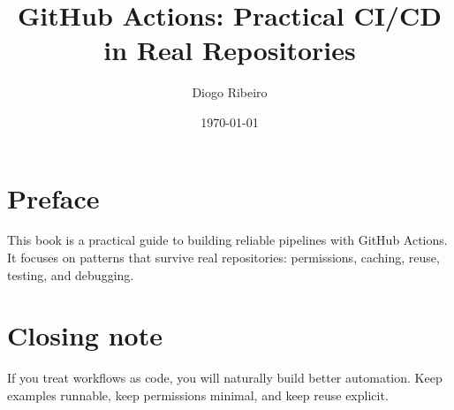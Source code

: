 \documentclass[11pt,a4paper,oneside]{book}
\title{GitHub Actions: Practical CI/CD in Real Repositories}
\author{Diogo Ribeiro}
\date{\today}
\begin{document}
\frontmatter
\maketitle
\tableofcontents

\chapter*{Preface}
This book is a practical guide to building reliable pipelines with GitHub Actions.
It focuses on patterns that survive real repositories: permissions, caching, reuse, testing, and debugging.

\mainmatter


















\appendix



\backmatter
\chapter*{Closing note}
If you treat workflows as code, you will naturally build better automation.
Keep examples runnable, keep permissions minimal, and keep reuse explicit.
\end{document}
